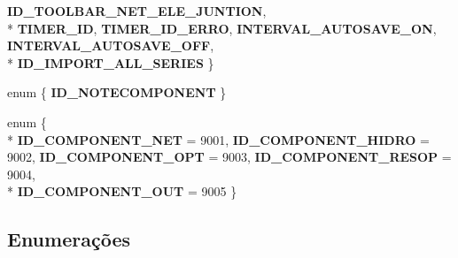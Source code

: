 \begin{DoxyCompactItemize}
{\bf I\+D\+\_\+\+T\+O\+O\+L\+B\+A\+R\+\_\+\+N\+E\+T\+\_\+\+E\+L\+E\+\_\+\+J\+U\+N\+T\+I\+ON}, 
\\*
{\bf T\+I\+M\+E\+R\+\_\+\+ID}, 
{\bf T\+I\+M\+E\+R\+\_\+\+I\+D\+\_\+\+E\+R\+RO}, 
{\bf I\+N\+T\+E\+R\+V\+A\+L\+\_\+\+A\+U\+T\+O\+S\+A\+V\+E\+\_\+\+ON}, 
{\bf I\+N\+T\+E\+R\+V\+A\+L\+\_\+\+A\+U\+T\+O\+S\+A\+V\+E\+\_\+\+O\+FF}, 
\\*
{\bf I\+D\+\_\+\+I\+M\+P\+O\+R\+T\+\_\+\+A\+L\+L\+\_\+\+S\+E\+R\+I\+ES}
 \}
\item 
enum \{ {\bf I\+D\+\_\+\+N\+O\+T\+E\+C\+O\+M\+P\+O\+N\+E\+NT}
 \}
\item 
enum \{ \\*
{\bf I\+D\+\_\+\+C\+O\+M\+P\+O\+N\+E\+N\+T\+\_\+\+N\+ET} = 9001, 
{\bf I\+D\+\_\+\+C\+O\+M\+P\+O\+N\+E\+N\+T\+\_\+\+H\+I\+D\+RO} = 9002, 
{\bf I\+D\+\_\+\+C\+O\+M\+P\+O\+N\+E\+N\+T\+\_\+\+O\+PT} = 9003, 
{\bf I\+D\+\_\+\+C\+O\+M\+P\+O\+N\+E\+N\+T\+\_\+\+R\+E\+S\+OP} = 9004, 
\\*
{\bf I\+D\+\_\+\+C\+O\+M\+P\+O\+N\+E\+N\+T\+\_\+\+O\+UT} = 9005
 \}
\end{DoxyCompactItemize}


\subsection{Enumerações}
